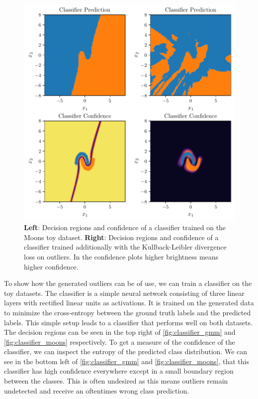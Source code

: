 \begin{figure}[htpb]
	\centering
        \includegraphics{figures/toy_example/moons/classifier.pdf}
        \caption{\textbf{Left}: Decision regions and confidence of a classifier trained on the
            Moons toy dataset. \textbf{Right}: Decision regions and
            confidence of a classifier trained additionally with the
        Kullback-Leibler divergence loss on outliers. In the confidence plots
    higher brightness means higher confidence.}%
	\label{fig:classifier_moons}
\end{figure}

To show how the generated outliers can be of use, we can train a classifier on
the toy datasets. The classifier is a simple neural network consisting of three
linear layers with rectified linear units as activations. It is trained on the
generated data to minimize the cross-entropy between the ground truth labels
and the predicted labels. This simple setup leads to a classifier that
performs well on both datasets. The decision regions can be seen in the top
right of
\autoref{fig:classifier_gmm} and \autoref{fig:classifier_moons} respectively. To get a
measure of the confidence of the classifier, we can inspect the entropy of the
predicted class distribution. We can see in the bottom left of
\autoref{fig:classifier_gmm} and
\autoref{fig:classifier_moons}, that this classifier has high confidence
everywhere except in a small boundary region between the classes. This is often
undesired as this means outliers remain undetected and receive an oftentimes
wrong class prediction.

